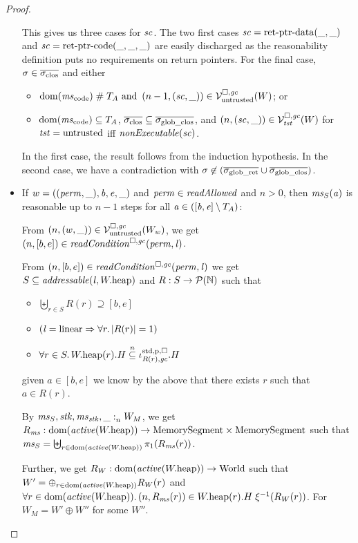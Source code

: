 \documentclass[a4paper]{article}
\begin{document}
\begin{proof}
\begin{itemize}
    This gives us three cases for $\mathit{sc}$.
    The two first cases $\mathit{sc} = \mathrm{ret\text{-}ptr\text{-}data}(\_,\_)$ and $\mathit{sc} = \mathrm{ret\text{-}ptr\text{-}code}(\_,\_,\_)$ are easily discharged as the reasonability definition puts no requirements on return pointers.
    For the final case, $\sigma \in \sigcloss$ and either
    \begin{itemize}
    \item $\dom(\mscode) \mathrel{\#} \ta \tand \npair[n-1]{(\vsc,\_)} \in \lrv (W)$; or
    \item $\dom(\mscode) \subseteq \ta$, $\sigcloss \subseteq \gsigcloss$, and $\left(n,(\mathit{sc},\_)\right) \in \mathcal{V}^{\square,\mathit{gc}}_{\mathit{tst}}(W)$ for $\mathit{tst} = \mathrm{untrusted}$ iff $\nonExec{\vsc}$.
    \end{itemize}
    In the first case, the result follows from the induction hypothesis.
    In the second case, we have a contradiction with $\sigma \not\in (\overline{\sigma_{\mathrm{glob\_ret}}}\cup \overline{\sigma_{\mathrm{glob\_clos}}})$.

  \item If $w = ((\mathit{perm},\_),\mathit{b},\mathit{e},\_)$ and $\perm \in \readAllowed{}$ and $n > 0$, then $\mathit{ms}_S(\mathit{a})$ is reasonable up to $n - 1$ steps for all $\mathit{a} \in ([\mathit{b},\mathit{e}] \setminus T_{A})$:

    From $\left(n,(w,\_)\right) \in \mathcal{V}^{\square,\mathit{gc}}_{\mathrm{untrusted}}(W_w)$, we get $\npair[n]{[b,e]} \in \readCond{\perm,\lin}$.

    From $\npair[n]{[b,e]} \in \readCond{\perm,\lin}$ we get $S\subseteq \addressable{\lin,\pwheap}$ and $R : S \rightarrow \mathcal{P}(\mathbb{N})$ such that
    \begin{itemize}
    \item $\biguplus_{r\in S} R(r) \supseteq [b,e]$
    \item $(\mathit{l} = \mathrm{linear} \Rightarrow \forall r\ldotp |R(r)|  = 1)$
    \item $\forall r \in S \ldotp W.\mathrm{heap}(r).H \overset{n}{\subseteq} \iota^{\mathrm{std},\mathrm{p},\square}_{R(r),\mathit{gc}}.H$
    \end{itemize}
    given $a \in [b,e]$ we know by the above that there exists $r$ such that $a
    \in R(r)$.

    By $\mathit{ms}_S,\mathit{stk},\mathit{ms}_{\mathit{stk}},\_ :_{n}^{}W_M$, we get $R_\ms : \dom(\activeReg{\pwheap}) \fun \MemSeg \times \MemSeg$ such that $\ms_S = \biguplus_{r \in \dom(\activeReg{\pwheap})} \pi_1(R_\ms(r))$.
    
    Further, we get $R_W : \dom(\activeReg{\pwheap}) \fun \World$ such that $W' = \oplus_{r \in \dom(\activeReg{\pwheap})} R_W(r)$ and $\forall r \in \dom(\activeReg{\pwheap}) \ldotp \npair{R_\ms(r)} \in \pwheap(r).H \; \xi^{-1}(R_W(r))$.
    For $W_M = W' \oplus W''$ for some $W''$.


\end{itemize}
\end{proof}
\end{document}
